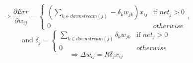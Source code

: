 \begin{equation*}
	\Rightarrow
	\frac{\partial Err}{\partial w_{ij}} = 
	\begin{cases}
			(\sum_{k \in downstream(j)}-\delta_k w_{jk}) x_{ij}& \mbox{if } net_{j} > 0 \\
			0 & otherwise 
	\end{cases},
\end{equation*}
\begin{equation*}
	 \mbox{and }\delta_j = 
	\begin{cases}
			\sum_{k \in downstream(j)}\delta_k w_{jk}  & \mbox{if } net_{j} > 0 \\
			0 & otherwise
	\end{cases}
\end{equation*}
\begin{equation*}
	\Rightarrow \Delta w_{ij} = R\delta_jx_{ij}
\end{equation*}
\clearpage

